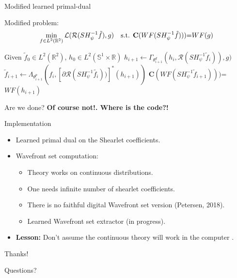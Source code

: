 \begin{frame}{Modified learned primal-dual}

 Modified problem:
$$
\min_{f\in L^2(\mathbb{R}^2)} \mathcal{L}(\mathcal{R}(SH_{\psi}^{-1}\tilde{f}),g) \quad \text{s.t. \textbf{C}$(WF(SH_{\psi}^{-1}\tilde{f})))$=$WF(g)$}
$$

\begin{algorithm}[H]
\begin{algorithmic}[1]
\STATE Given $\tilde{f}_0\in L^2(\mathbb{R}^2)$, $h_0\in L^2(\mathbb{S}^1\times \mathbb{R})$
\STATE $h_{i+1}\longleftarrow \Gamma_{\theta_{i+1}^d} (h_i,\mathcal{R}(SH_{\psi}^{-1}\tilde{f}_i)),g)$
\STATE $\tilde{f}_{i+1}\longleftarrow \Lambda_{\theta_{i+1}^p} (f_i,[\partial\mathcal{R}(SH_{\psi}^{-1}\tilde{f_i}))]^*(h_{i+1}))$
\STATE \textbf{C}$(WF(SH_{\psi}^{-1}\tilde{f}_{i+1})))$=$WF(h_{i+1})$
\ENDFOR
\end{algorithmic}
\caption{Modified learned primal-dual algorithm}
\label{alg:seq}
\end{algorithm}

\pause
\bigskip

Are we done? \pause \textbf{Of course not!. Where is the code?!}
\end{frame}

\begin{frame}{Implementation}
\begin{itemize}
\item Learned primal dual on the Shearlet coefficients. \checked

\pause
\bigskip

\item Wavefront set computation:
\pause 

\begin{itemize}

\bigskip

\item Theory works on continuous distributions.

\pause
\bigskip

\item One needs infinite number of shearlet coefficients.

\pause
\bigskip

\item There is no faithful digital Wavefront set version (Petersen, 2018).

\pause
\bigskip

\item Learned Wavefront set extractor (in progress).
\end{itemize}

\bigskip
\pause

\item \textbf{Lesson:} Don't assume the continuous theory will work in the computer \Frowny{}.
\end{itemize}
\end{frame}

\begin{frame}{Thanks!}
\begin{center}
\Large{Questions?}
\end{center}
\end{frame}

